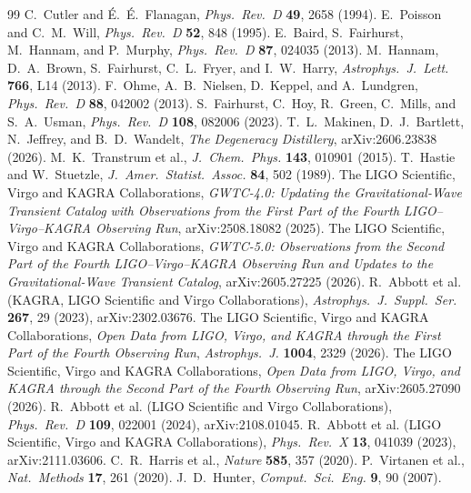 \documentclass[aps,preprint,amsmath,amssymb,nofootinbib,superscriptaddress]{revtex4-2}
\begin{document}
\begin{thebibliography}{99}
 C.~Cutler and {\'E}.~{\'E}.~Flanagan,
\emph{Phys.\ Rev.\ D} \textbf{49}, 2658 (1994).
 E.~Poisson and C.~M.~Will,
\emph{Phys.\ Rev.\ D} \textbf{52}, 848 (1995).
 E.~Baird, S.~Fairhurst, M.~Hannam, and P.~Murphy,
\emph{Phys.\ Rev.\ D} \textbf{87}, 024035 (2013).
 M.~Hannam, D.~A.~Brown, S.~Fairhurst, C.~L.~Fryer, and
I.~W.~Harry, \emph{Astrophys.\ J.\ Lett.} \textbf{766}, L14 (2013).
 F.~Ohme, A.~B.~Nielsen, D.~Keppel, and A.~Lundgren,
\emph{Phys.\ Rev.\ D} \textbf{88}, 042002 (2013).
 S.~Fairhurst, C.~Hoy, R.~Green, C.~Mills, and
S.~A.~Usman, \emph{Phys.\ Rev.\ D} \textbf{108}, 082006 (2023).
 T.~L.~Makinen, D.~J.~Bartlett, N.~Jeffrey, and
B.~D.~Wandelt, \emph{The Degeneracy Distillery}, arXiv:2606.23838 (2026).
 M.~K.~Transtrum et al.,
\emph{J.\ Chem.\ Phys.} \textbf{143}, 010901 (2015).
 T.~Hastie and W.~Stuetzle,
\emph{J.\ Amer.\ Statist.\ Assoc.} \textbf{84}, 502 (1989).
 The LIGO Scientific, Virgo and KAGRA Collaborations,
\emph{GWTC-4.0: Updating the Gravitational-Wave Transient Catalog with Observations from the First Part
of the Fourth LIGO--Virgo--KAGRA Observing Run}, arXiv:2508.18082 (2025).
 The LIGO Scientific, Virgo and KAGRA Collaborations,
\emph{GWTC-5.0: Observations from the Second Part of the Fourth LIGO--Virgo--KAGRA Observing Run and
Updates to the Gravitational-Wave Transient Catalog}, arXiv:2605.27225 (2026).
 R.~Abbott et al. (KAGRA, LIGO Scientific and Virgo Collaborations),
\emph{Astrophys.\ J.\ Suppl.\ Ser.} \textbf{267}, 29 (2023), arXiv:2302.03676.
 The LIGO Scientific, Virgo and KAGRA Collaborations,
\emph{Open Data from LIGO, Virgo, and KAGRA through the First Part of the Fourth Observing Run},
\emph{Astrophys.\ J.} \textbf{1004}, 2329 (2026).
 The LIGO Scientific, Virgo and KAGRA Collaborations,
\emph{Open Data from LIGO, Virgo, and KAGRA through the Second Part of the Fourth Observing Run},
arXiv:2605.27090 (2026).
 R.~Abbott et al. (LIGO Scientific and Virgo Collaborations),
\emph{Phys.\ Rev.\ D} \textbf{109}, 022001 (2024), arXiv:2108.01045.
 R.~Abbott et al. (LIGO Scientific, Virgo and KAGRA Collaborations),
\emph{Phys.\ Rev.\ X} \textbf{13}, 041039 (2023), arXiv:2111.03606.
 C.~R.~Harris et al., \emph{Nature} \textbf{585}, 357 (2020).
 P.~Virtanen et al., \emph{Nat.\ Methods} \textbf{17}, 261 (2020).
 J.~D.~Hunter, \emph{Comput.\ Sci.\ Eng.} \textbf{9}, 90 (2007).
\end{thebibliography}
\end{document}
